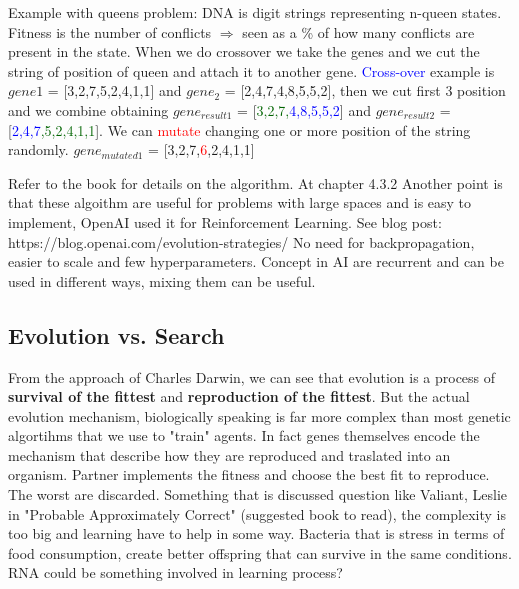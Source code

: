 \documentclass[12pt]{book}
\begin{document}
Example with queens problem:
DNA is digit strings representing n-queen states.
Fitness is the number of conflicts $\Rightarrow$ seen as a \% of how many conflicts are present in the state.
When we do crossover we take the genes and we cut the string of position of queen and attach it to another gene.\newline
\newline
\textcolor{blue}{Cross-over} example is $gene{1}$ = {[3,2,7,5,2,4,1,1]} and $gene_{2}$ = {[2,4,7,4,8,5,5,2]}, then we cut first 3 position and we combine obtaining \newline
$gene_{result1}$ = {[\textcolor{darkgreen}{3,2,7,}\textcolor{blue}{4,8,5,5,2}]} and $gene_{result2}$ = {[\textcolor{blue}{2,4,7}\textcolor{darkgreen}{,5,2,4,1,1}]}.\newline
 We can \textcolor{red}{mutate} changing one or more position of the string randomly.
$gene_{mutated1}$ = {[3,2,7,\textcolor{red}{6},2,4,1,1]} 

Refer to the book for details on the algorithm. At chapter 4.3.2
\newline\newline
Another point is that these algoithm are useful for problems with large spaces and is easy to implement, OpenAI used it for Reinforcement Learning.
See blog post: https://blog.openai.com/evolution-strategies/
\newline
No need for backpropagation, easier to scale and few hyperparameters.
Concept in AI are recurrent and can be used in different ways, mixing them can be useful.

\subsection{Evolution vs. Search}
From the approach of Charles Darwin, we can see that evolution is a process of \textbf{survival of the fittest} and \textbf{reproduction of the fittest}.
But the actual evolution mechanism, biologically speaking is far more complex than most genetic algortihms that we use to "train" agents.
In fact genes themselves encode the mechanism that describe how they are reproduced and traslated into an organism.
Partner implements the fitness and choose the best fit to reproduce. The worst are discarded.
Something that is discussed question like Valiant, Leslie in "Probable Approximately Correct" (suggested book to read), the complexity is too big and learning have to help in some way.
Bacteria that is stress in terms of food consumption, create better offspring that can survive in the same conditions. \newline
RNA could be something involved in learning process?
\end{document}
